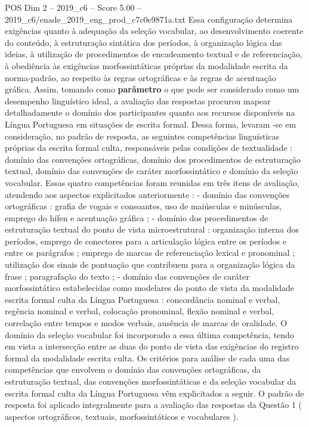 \begin{textsample}{POS Dim 2 – 2019\_c6 – Score 5.00 – 2019\_c6/enade\_2019\_eng\_prod\_c7c0e9871a.txt}
Essa configuração determina exigências quanto à adequação da seleção vocabular, ao desenvolvimento coerente do conteúdo, à estruturação sintática dos períodos, à organização lógica das ideias, à utilização de procedimentos de encadeamento textual e de referenciação, à obediência às exigências morfossintáticas próprias da modalidade escrita da norma-padrão, ao respeito às regras ortográficas e às regras de acentuação gráfica.
Assim, tomando como \textbf{parâmetro} o que pode ser considerado como um desempenho linguístico ideal, a avaliação das respostas procurou mapear detalhadamente o domínio dos participantes quanto aos recursos disponíveis na Língua Portuguesa em situações de escrita formal.
Dessa forma, levaram -se em consideração, no padrão de resposta, as seguintes competências linguísticas próprias da escrita formal culta, responsáveis pelas condições de textualidade : domínio das convenções ortográficas, domínio dos procedimentos de estruturação textual, domínio das convenções de caráter morfossintático e domínio da seleção vocabular.
Essas quatro competências foram reunidas em três itens de avaliação, atendendo aos aspectos explicitados anteriormente : - domínio das convenções ortográficas : grafia de vogais e consoantes, uso de maiúsculas e minúsculas, emprego do hífen e acentuação gráfica ; - domínio dos procedimentos de estruturação textual do ponto de vista microestrutural : organização interna dos períodos, emprego de conectores para a articulação lógica entre os períodos e entre os parágrafos ; emprego de marcas de referenciação lexical e pronominal ; utilização dos sinais de pontuação que contribuem para a organização lógica da frase ; paragrafação do texto ; - domínio das convenções de caráter morfossintático estabelecidas como modelares do ponto de vista da modalidade escrita formal culta da Língua Portuguesa : concordância nominal e verbal, regência nominal e verbal, colocação pronominal, flexão nominal e verbal, correlação entre tempos e modos verbais, ausência de marcas de oralidade.
O domínio da seleção vocabular foi incorporado a essa última competência, tendo em vista a intersecção entre as duas do ponto de vista das exigências do registro formal da modalidade escrita culta.
Os critérios para análise de cada uma das competências que envolvem o domínio das convenções ortográficas, da estruturação textual, das convenções morfossintáticas e da seleção vocabular da escrita formal culta da Língua Portuguesa vêm explicitados a seguir.
O padrão de resposta foi aplicado integralmente para a avaliação das respostas da Questão 1 ( aspectos ortográficos, textuais, morfossintáticos e vocabulares ).

\end{textsample}
